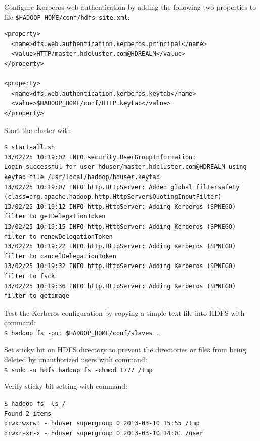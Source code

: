 Configure Kerberos web authentication by adding the following two properties to file \verb|$HADOOP_HOME/conf/hdfs-site.xml|:
\lstset{style=bashstyle}
\begin{lstlisting}
<property>
  <name>dfs.web.authentication.kerberos.principal</name>
  <value>HTTP/master.hdcluster.com@HDREALM</value>
</property>

<property>
  <name>dfs.web.authentication.kerberos.keytab</name>
  <value>$HADOOP_HOME/conf/HTTP.keytab</value>
</property>
\end{lstlisting}

Start the cluster with:
\lstset{style=bashstyle}
\begin{lstlisting}
$ start-all.sh
13/02/25 10:19:02 INFO security.UserGroupInformation:
Login successful for user hduser/master.hdcluster.com@HDREALM using keytab file /usr/local/hadoop/hduser.keytab
13/02/25 10:19:07 INFO http.HttpServer: Added global filtersafety (class=org.apache.hadoop.http.HttpServer$QuotingInputFilter)
13/02/25 10:19:12 INFO http.HttpServer: Adding Kerberos (SPNEGO) filter to getDelegationToken
13/02/25 10:19:15 INFO http.HttpServer: Adding Kerberos (SPNEGO) filter to renewDelegationToken
13/02/25 10:19:22 INFO http.HttpServer: Adding Kerberos (SPNEGO) filter to cancelDelegationToken
13/02/25 10:19:32 INFO http.HttpServer: Adding Kerberos (SPNEGO) filter to fsck
13/02/25 10:19:36 INFO http.HttpServer: Adding Kerberos (SPNEGO) filter to getimage
\end{lstlisting}

Test the Kerberos configuration by copying a simple text file into HDFS with command: \\
\verb|$ hadoop fs -put $HADOOP_HOME/conf/slaves .|

Set sticky bit on HDFS directory to prevent the directories or files from being deleted by unauthorized users with command: \\
\verb|$ sudo -u hdfs hadoop fs -chmod 1777 /tmp|

Verify sticky bit setting with command:
\begin{verbatim}
$ hadoop fs -ls /
Found 2 items
drwxrwxrwt - hduser supergroup 0 2013-03-10 15:55 /tmp
drwxr-xr-x - hduser supergroup 0 2013-03-10 14:01 /user
\end{verbatim}


